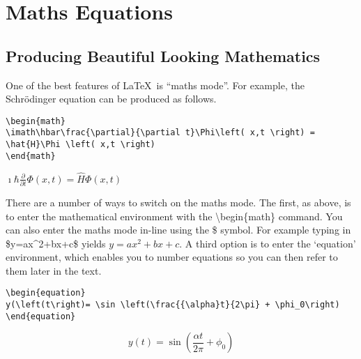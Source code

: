 \chapter{Maths Equations}

\section{Producing Beautiful Looking Mathematics}

One of the best features of \LaTeX\ is ``maths mode''. For example, the Schr\"{o}dinger equation can be produced as follows.

\vspace*{2ex}

\begin{verbatim}
\begin{math}
\imath\hbar\frac{\partial}{\partial t}\Phi\left( x,t \right) =
\hat{H}\Phi \left( x,t \right)
\end{math}
\end{verbatim}

\vspace*{2ex}

\begin{center}
\begin{math}
\imath\hbar\frac{\partial}{\partial t}\Phi\left( x,t \right) =
\hat{H}\Phi \left( x,t \right)
\end{math}
\end{center}

There are a number of ways to switch on the maths mode. The first, as above, is to enter the mathematical environment with the {\textbackslash}begin\{math\} command. You can also enter the maths mode in-line using the \$ symbol. For example typing in \$y=ax\textasciicircum{}2+bx+c\$ yields $y=ax^2+bx+c$. A third option is to enter the `equation' environment, which enables you to number equations so you can then refer to them later in the text.

\vspace*{2ex}

\begin{verbatim}
\begin{equation}
y(\left(t\right)= \sin \left(\frac{{\alpha}t}{2\pi} + \phi_0\right)
\end{equation}
\end{verbatim}

\vspace*{2ex}

\begin{equation}
y\left(t\right)= \sin \left(\frac{{\alpha}t}{2\pi} + \phi_0\right)
\label{eqn:MadeUpNonsense}
\end{equation}

